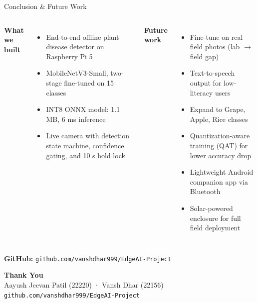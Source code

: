 \documentclass[aspectratio=169]{beamer}
\begin{document}
\begin{frame}{Conclusion \& Future Work}
  \begin{columns}
      \textbf{What we built}
      \begin{itemize}
        \item End-to-end offline plant disease detector on Raspberry Pi 5
        \item MobileNetV3-Small, two-stage fine-tuned on 15 classes
        \item INT8 ONNX model: 1.1 MB, 6 ms inference
        \item Live camera with detection state machine, confidence gating, and 10 s hold lock
      \end{itemize}
      \textbf{Future work}
      \begin{itemize}
        \item Fine-tune on real field photos (lab $\rightarrow$ field gap)
        \item Text-to-speech output for low-literacy users
        \item Expand to Grape, Apple, Rice classes
        \item Quantization-aware training (QAT) for lower accuracy drop
        \item Lightweight Android companion app via Bluetooth
        \item Solar-powered enclosure for full field deployment
      \end{itemize}
  \end{columns}
  \vspace{0.5cm}
  \begin{center}
    \large\textbf{GitHub:} \texttt{github.com/vanshdhar999/EdgeAI-Project}
  \end{center}
\end{frame}

\begin{frame}
  \begin{center}
    \vspace{1cm}
    {\Huge \textbf{Thank You}}\\[0.8cm]
    {\large Aayush Jeevan Patil (22220) \quad · \quad Vansh Dhar (22156)}\\[0.4cm]
    {\normalsize \texttt{github.com/vanshdhar999/EdgeAI-Project}}
  \end{center}
\end{frame}
\end{document}

